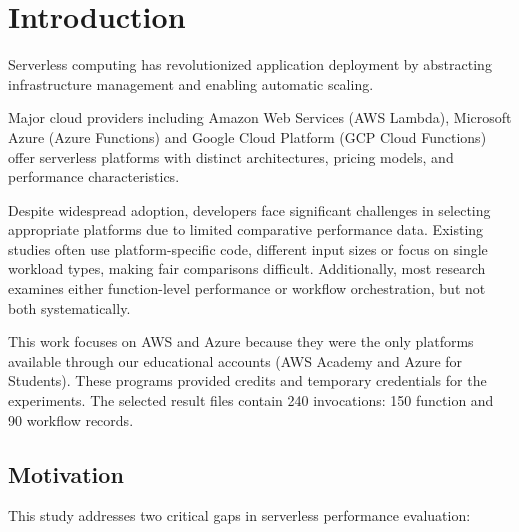 \documentclass[sigconf,nonacm]{acmart}
\begin{document}


\maketitle


\section{Introduction}

Serverless computing has revolutionized application deployment by abstracting infrastructure management and enabling automatic scaling.

Major cloud providers including Amazon Web Services (AWS Lambda),  Microsoft Azure (Azure Functions) and Google Cloud Platform (GCP Cloud Functions) offer serverless platforms with distinct architectures, pricing models, and performance characteristics.

Despite widespread adoption, developers face significant challenges in selecting appropriate platforms due to limited comparative performance data. Existing studies often use platform-specific code, different input sizes or focus on single workload types, making fair comparisons difficult. Additionally, most research examines either function-level performance or workflow orchestration, but not both systematically.

This work focuses on AWS and Azure because they were the only platforms available through our educational accounts (AWS Academy and Azure for Students). These programs provided credits and temporary credentials for the experiments. The selected result files contain 240 invocations: 150 function and 90 workflow records.

\subsection{Motivation}

This study addresses two critical gaps in serverless performance evaluation:
\end{document}
